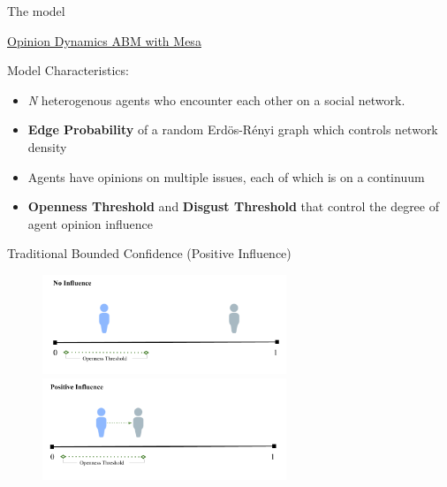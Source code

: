\documentclass[12pt]{beamer}
\begin{document}
\begin{frame}[c]{The model}  %




\large

\centering
	\underline{Opinion Dynamics ABM with Mesa}

\vspace{.05in}
	Model Characteristics:
\vspace{-.15in}

\small
\begin{itemize}
\itemsep.1em
\item \textit{N} heterogenous agents who encounter each other on a social network.
\item \textbf{Edge Probability} of a random Erd\"{o}s-R\'{e}nyi graph which controls network density
\item Agents have opinions on multiple issues, each of which is on a continuum
\item \textbf{Openness Threshold} and \textbf{Disgust Threshold} that control the degree of agent opinion influence
\end{itemize}


\end{frame}


\begin{frame}[c]{\normalsize Traditional Bounded Confidence (Positive Influence)}  %


\begin{figure}
	\includegraphics[width=0.65\textwidth]{images/BCNoInfluence.png}
	\hfill
	\includegraphics[width=0.65\textwidth]{images/BCPositiveInfluence.png}
\end{figure}


\end{frame}
\end{document}
